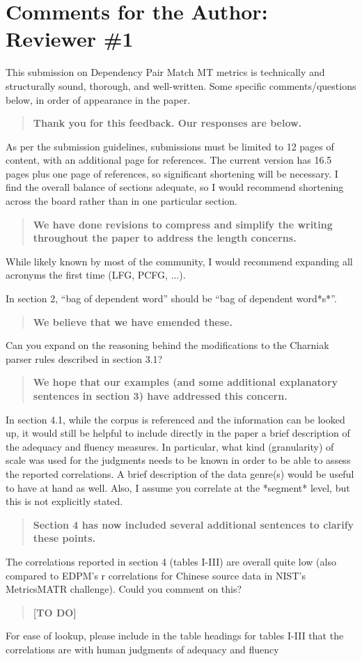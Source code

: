 \documentclass[letterpaper,12pt]{article}
\newenvironment{response}
{\begin{quotation} \bf}
  {\end{quotation}}
\begin{document}
\section{Comments for the Author: Reviewer \#1}
\label{sec:reviewer1}

This submission on Dependency Pair Match MT metrics is technically and
structurally sound, thorough, and well-written.  Some specific
comments/questions below, in order of appearance in the paper.
\begin{response}
  Thank you for this feedback. Our responses are below.
\end{response}
As per the submission guidelines, submissions must be limited to 12
pages of content, with an additional page for references.  The current
version has 16.5 pages plus one page of references, so significant
shortening will be necessary.  I find the overall balance of sections
adequate, so I would recommend shortening across the board rather than
in one particular section.
\begin{response}
  We have done revisions to compress and simplify the writing
  throughout the paper to address the length concerns.
\end{response}
While likely known by most of the community, I would recommend
expanding all acronyms the first time (LFG, PCFG, ...).

In section 2, ``bag of dependent word'' should be ``bag of dependent
word*s*''.
\begin{response}
  We believe that we have emended these.
\end{response}
Can you expand on the reasoning behind the modifications to the
Charniak parser rules described in section 3.1?
\begin{response}
  We hope that our examples (and some additional explanatory sentences
  in section 3) have addressed this concern.
\end{response}
In section 4.1, while the corpus is referenced and the information can
be looked up, it would still be helpful to include directly in the
paper a brief description of the adequacy and fluency measures.  In
particular, what kind (granularity) of scale was used for the
judgments needs to be known in order to be able to assess the reported
correlations.  A brief description of the data genre(s) would be
useful to have at hand as well.  Also, I assume you correlate at the
*segment* level, but this is not explicitly stated.
\begin{response}
  Section 4 has now included several additional sentences to clarify
  these points.
\end{response}
The correlations reported in section 4 (tables I-III) are overall
quite low (also compared to EDPM's r correlations for Chinese source
data in NIST's MetricsMATR challenge).  Could you comment on this?
\begin{response}
 [TO DO]
\end{response}
For ease of lookup, please include in the table headings for tables
I-III that the correlations are with human judgments of adequacy and
fluency
\end{document}
